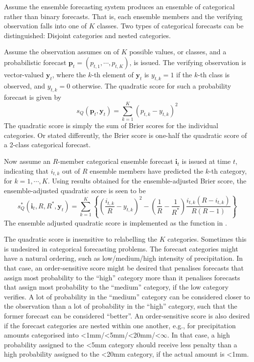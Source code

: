 \documentclass[article]{jss}
\begin{document}
Assume the ensemble forecasting system produces an ensemble of categorical rather than binary forecasts.
That is, each ensemble members and the verifying observation falls into one of $K$ classes.
Two types of categorical forecasts can be distinguished: Disjoint categories and nested categories.

Assume the observation assumes on of $K$ possible values, or classes, and a probabilistic forecast $\mathbf{p}_t = (p_{t,1}, \cdots, p_{t,K})$, is issued.
The verifying observation is vector-valued $\mathbf{y}_t$, where the $k$-th element of $\mathbf{y}_t$ is $y_{t,k}=1$ if the $k$-th class is observed, and $y_{t,k}=0$ otherwise.
The quadratic score for such a probability forecast is given by
%
\begin{equation}
s_{Q}(\mathbf{p}_t, \mathbf{y}_t) = \sum_{k=1}^K \left(p_{t,k} - y_{t,k}\right)^2
\end{equation}
%
The quadratic score is simply the sum of Brier scores for the individual categories.
Or stated differently, the Brier score is one-half the quadratic score of a 2-class categorical forecast.

Now assume an $R$-member categorical ensemble forecast $\mathbf{i}_t$ is issued at time $t$, indicating that $i_{t,k}$ out of $R$ ensemble members have predicted the $k$-th category, for $k=1,\cdots,K$.
Using results obtained for the ensemble-adjusted Brier score, the ensemble-adjusted quadratic score is seen to be
%
\begin{equation}
s_{Q}^*(\mathbf{i}_t, R, R^*, \mathbf{y}_t) = \sum_{k=1}^K \left\{ \left(\frac{i_{t,k}}{R} - y_{t,k}\right)^2 - \left(\frac{1}{R} - \frac{1}{R^*}\right) \frac{i_{t,k}(R-i_{t,k})}{R(R-1)}\right\}
\end{equation}
%
The ensemble adjusted quadratic score is implemented as the function  in .


The quadratic score is insensitive to relabelling the $K$ categories.
Sometimes this is undesired in categorical forecasting problems. 
The forecast categories might have a natural ordering, such as low/medium/high intensity of precipitation.
In that case, an order-sensitive score might be desired that penalises forecasts that assign most probability to the ``high'' category more than it penalises forecasts that assign most probability to the ``medium'' category, if the low category verifies. 
A lot of probability in the ``medium'' category can be considered closer to the observation than a lot of probability in the ``high'' category, such that the former forecast can be considered ``better''.
An order-sensitive score is also desired if the forecast categories are nested within one another, e.g., for precipitation amounts categorised into <1mm/<5mm/<20mm/<$\infty$.
In that case, a high probability assigned to the <5mm category should receive less penalty than a high probability assigned to the <20mm category, if the actual amount is <1mm.
\end{document}
